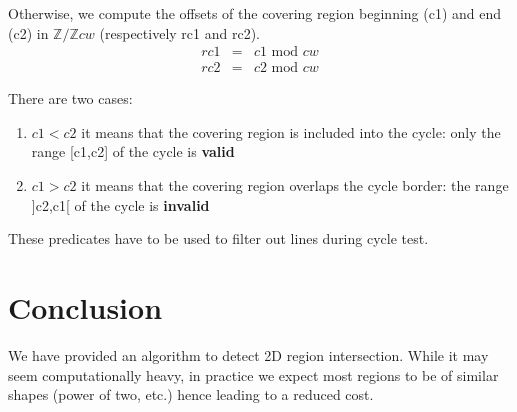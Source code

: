 \documentclass[twocolumn]{article}
\begin{document}
Otherwise, we compute the offsets of the covering region beginning (c1) and end
(c2) in $\mathbb{Z}/\mathbb{Z}cw$ (respectively rc1 and rc2).
\[
\begin{array}{rcl}
rc1 &=& c1 \textrm{ mod } cw \\
rc2 &=& c2 \textrm{ mod } cw
\end{array}
\]

There are two cases:
\begin{enumerate}
   \item $c1 < c2$ it means that the covering region is included into the cycle:
   only the range [c1,c2] of the cycle is \textbf{valid}
   \item $c1 > c2$ it means that the covering region overlaps the cycle border:
   the range ]c2,c1[ of the cycle is \textbf{invalid}
\end{enumerate}

These predicates have to be used to filter out lines during cycle test.


\section{Conclusion}

We have provided an algorithm to detect 2D region intersection. While it may
seem computationally heavy, in practice we expect most regions to be of similar
shapes (power of two, etc.) hence leading to a reduced cost.
\end{document}
